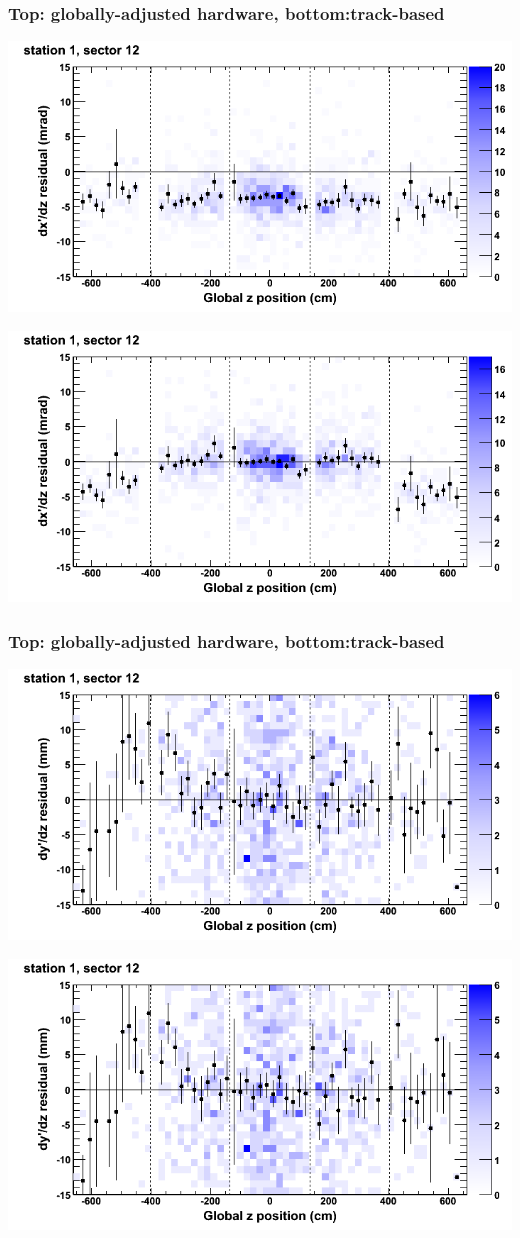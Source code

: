 \documentclass[compress]{beamer}
\begin{document}
\begin{frame}
\frametitle{Top: globally-adjusted hardware, bottom:track-based}
\includegraphics[width=0.7\linewidth]{NOV4_mapplots_HW/DTvsz_st1sec12_dxdz.png}

\includegraphics[width=0.7\linewidth]{NOV4_mapplots/DTvsz_st1sec12_dxdz.png}
\end{frame}

\begin{frame}
\frametitle{Top: globally-adjusted hardware, bottom:track-based}
\includegraphics[width=0.7\linewidth]{NOV4_mapplots_HW/DTvsz_st1sec12_dydz.png}

\includegraphics[width=0.7\linewidth]{NOV4_mapplots/DTvsz_st1sec12_dydz.png}
\end{frame}
\end{document}
